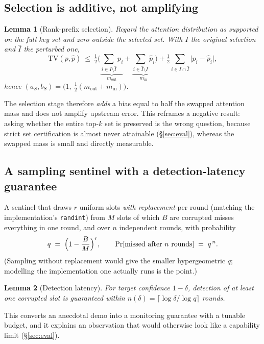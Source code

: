 \documentclass[11pt]{article}
\newtheorem{lemma}{Lemma}
\begin{document}
\subsection{Selection is additive, not amplifying}
\begin{lemma}[Rank-prefix selection]\label{lem:sel}
Regard the attention distribution as supported on the full key set and zero outside
the selected set. With $I$ the original selection and $\hat I$ the perturbed one,
\begin{equation}
\mathrm{TV}(p,\hat p)\ \le\
\tfrac12\Big(\underbrace{\textstyle\sum_{i\in I\setminus\hat I}p_i}_{m_{\mathrm{out}}}
+\underbrace{\textstyle\sum_{i\in\hat I\setminus I}\hat p_i}_{m_{\mathrm{in}}}\Big)
+\tfrac12\textstyle\sum_{i\in I\cap\hat I}\lvert p_i-\hat p_i\rvert ,
\label{eq:s2}
\end{equation}
hence $(a_S,b_S)=\big(1,\ \tfrac12(m_{\mathrm{out}}+m_{\mathrm{in}})\big)$.
\end{lemma}
The selection stage therefore \emph{adds} a bias equal to half the swapped attention
mass and does not amplify upstream error. This reframes a negative result: asking
whether the entire top-$k$ set is preserved is the wrong question, because strict set
certification is almost never attainable (\S\ref{sec:eval}), whereas the swapped mass
is small and directly measurable.

\subsection{A sampling sentinel with a detection-latency guarantee}
A sentinel that draws $r$ uniform slots \emph{with replacement} per round (matching
the implementation's \texttt{randint}) from $M$ slots of which $B$ are corrupted
misses everything in one round, and over $n$ independent rounds, with
probability
\begin{equation}
q \;=\; \Bigl(1-\frac{B}{M}\Bigr)^{r},
\qquad
\Pr[\text{missed after } n \text{ rounds}] \;=\; q^{\,n}.
\label{eq:sentinelmiss}
\end{equation} (Sampling without replacement would give
the smaller hypergeometric $q$; modelling the implementation one actually runs is
the point.)

\begin{lemma}[Detection latency]\label{lem:sentinel}
For target confidence $1-\delta$, detection of at least one corrupted slot is
guaranteed within $n(\delta)=\lceil\log\delta/\log q\rceil$ rounds.
\end{lemma}
This converts an anecdotal demo into a monitoring guarantee with a tunable budget,
and it explains an observation that would otherwise look like a capability limit
(\S\ref{sec:eval}).
\end{document}
